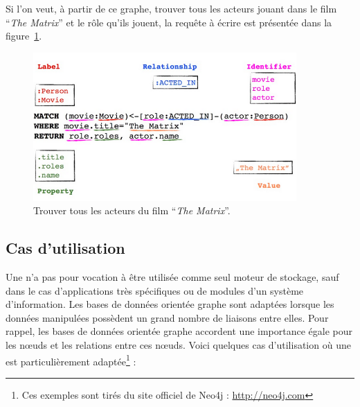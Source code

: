 	Si l'on veut, à partir de ce graphe, trouver tous les acteurs jouant dans le film \enquote{\textit{The Matrix}} et le rôle qu'ils jouent, la requête à écrire est présentée dans la figure~\ref{requeteNeo4j}.

	\begin{figure}[H]
		\centering
		\includegraphics[width=0.9\textwidth]{images/requeteNeo4j.png}
		\caption{Trouver tous les acteurs du film \enquote{\textit{The Matrix}}.\cite{grapheNeo4j}}
		\label{requeteNeo4j}
	\end{figure}

\subsection{Cas d'utilisation}
	Une \bddGraphe{} n'a pas pour vocation à être utilisée comme seul moteur de stockage, sauf dans le cas d'applications très spécifiques ou de modules d'un système d'information. Les bases de données orientée graphe sont adaptées lorsque les données manipulées possèdent un grand nombre de liaisons entre elles. Pour rappel, les bases de données orientée graphe accordent une importance égale pour les nœuds et les relations entre ces nœuds. Voici quelques cas d'utilisation où une \bddGraphe{} est particulièrement adaptée\footnote{Ces exemples sont tirés du site officiel de Neo4j : \url{http://neo4j.com}} :

